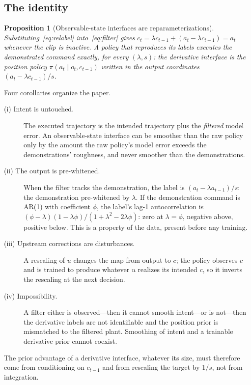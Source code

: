 \documentclass{article}
\newtheorem{proposition}{Proposition}
\begin{document}
\subsection{The identity}

\begin{proposition}[Observable-state interfaces are reparameterizations]
\label{prop:identity}
Substituting~\eqref{eq:relabel} into~\eqref{eq:filter} gives $c_t=\lambda c_{t-1}+(a_t-\lambda c_{t-1})=a_t$ whenever the clip is inactive. A policy that reproduces its labels executes the demonstrated command exactly, for every $(\lambda,s)$: the derivative interface is the position policy $\pi(a_t\mid o_t,c_{t-1})$ written in the output coordinates $(a_t-\lambda c_{t-1})/s$.
\end{proposition}

\noindent Four corollaries organize the paper.
\begin{description}
\item[(i) Intent is untouched.] The executed trajectory is the intended trajectory plus the \emph{filtered} model error. An observable-state interface can be smoother than the raw policy only by the amount the raw policy's model error exceeds the demonstrations' roughness, and never smoother than the demonstrations.
\item[(ii) The output is pre-whitened.] When the filter tracks the demonstration, the label is $(a_t-\lambda a_{t-1})/s$: the demonstration pre-whitened by $\lambda$. If the demonstration command is AR(1) with coefficient $\phi$, the label's lag-1 autocorrelation is $(\phi-\lambda)(1-\lambda\phi)/(1+\lambda^2-2\lambda\phi)$: zero at $\lambda=\phi$, negative above, positive below. This is a property of the data, present before any training.
\item[(iii) Upstream corrections are disturbances.] A rescaling of $u$ changes the map from output to $c$; the policy observes $c$ and is trained to produce whatever $u$ realizes its intended $c$, so it inverts the rescaling at the next decision.
\item[(iv) Impossibility.] A filter either is observed---then it cannot smooth intent---or is not---then the derivative labels are not identifiable and the position prior is mismatched to the filtered plant. Smoothing of intent and a trainable derivative prior cannot coexist.
\end{description}
The prior advantage of a derivative interface, whatever its size, must therefore come from conditioning on $c_{t-1}$ and from rescaling the target by $1/s$, not from integration.
\end{document}

